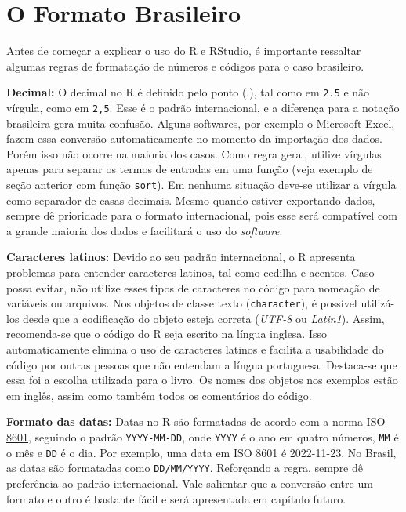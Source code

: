 \documentclass[
  11pt,
]{book}
\begin{document}
\hypertarget{o-formato-brasileiro}{%
\section{O Formato Brasileiro}\label{o-formato-brasileiro}}

Antes de começar a explicar o uso do R e RStudio, é importante ressaltar algumas regras de formatação de números e códigos para o caso brasileiro.

\textbf{Decimal:} O decimal no R é definido pelo ponto (.), tal como em \texttt{2.5} e não vírgula, como em \texttt{2,5}. Esse é o padrão internacional, e a diferença para a notação brasileira gera muita confusão. Alguns softwares, por exemplo o Microsoft Excel, fazem essa conversão automaticamente no momento da importação dos dados. Porém isso não ocorre na maioria dos casos. Como regra geral, utilize vírgulas apenas para separar os termos de entradas em uma função (veja exemplo de seção anterior com função \texttt{sort}). Em nenhuma situação deve-se utilizar a vírgula como separador de casas decimais. Mesmo quando estiver exportando dados, sempre dê prioridade para o formato internacional, pois esse será compatível com a grande maioria dos dados e facilitará o uso do \emph{software}.

\textbf{Caracteres latinos:} Devido ao seu padrão internacional, o R apresenta problemas para entender caracteres latinos, tal como cedilha e acentos. Caso possa evitar, não utilize esses tipos de caracteres no código para nomeação de variáveis ou arquivos. Nos objetos de classe texto (\texttt{character}), é possível utilizá-los desde que a codificação do objeto esteja correta (\emph{UTF-8} ou \emph{Latin1}). Assim, recomenda-se que o código do R seja escrito na língua inglesa. Isso automaticamente elimina o uso de caracteres latinos e facilita a usabilidade do código por outras pessoas que não entendam a língua portuguesa. Destaca-se que essa foi a escolha utilizada para o livro. Os nomes dos objetos nos exemplos estão em inglês, assim como também todos os comentários do código. 

\textbf{Formato das datas:} Datas no R são formatadas de acordo com a norma \href{https://www.iso.org/iso-8601-date-and-time-format.html}{ISO 8601}, seguindo o padrão \texttt{YYYY-MM-DD}, onde \texttt{YYYY} é o ano em quatro números, \texttt{MM} é o mês e \texttt{DD} é o dia. Por exemplo, uma data em ISO 8601 é 2022-11-23. No Brasil, as datas são formatadas como \texttt{DD/MM/YYYY}. Reforçando a regra, sempre dê preferência ao padrão internacional. Vale salientar que a conversão entre um formato e outro é bastante fácil e será apresentada em capítulo futuro.
\end{document}
